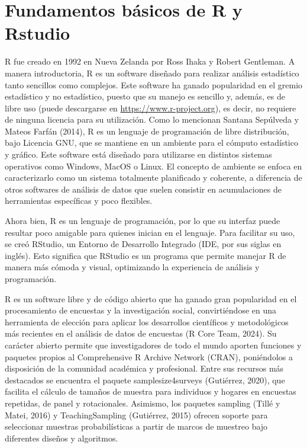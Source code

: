 \documentclass[
  spanish,
  12pt,
]{book}
\begin{document}
\section{Fundamentos básicos de R y Rstudio}\label{fundamentos-buxe1sicos-de-r-y-rstudio}

R fue creado en 1992 en Nueva Zelanda por Ross Ihaka y Robert Gentleman. A manera introductoria, R es un software diseñado para realizar análisis estadístico tanto sencillos como complejos. Este software ha ganado popularidad en el gremio estadístico y no estadístico, puesto que su manejo es sencillo y, además, es de libre uso (puede descargarse en \url{https://www.r-project.org}), es decir, no requiere de ninguna licencia para su utilización. Como lo mencionan Santana Sepúlveda y Mateos Farfán (2014), R es un lenguaje de programación de libre distribución, bajo Licencia GNU, que se mantiene en un ambiente para el cómputo estadístico y gráfico. Este software está diseñado para utilizarse en distintos sistemas operativos como Windows, MacOS o Linux. El concepto de ambiente se enfoca en caracterizarlo como un sistema totalmente planificado y coherente, a diferencia de otros softwares de análisis de datos que suelen consistir en acumulaciones de herramientas específicas y poco flexibles.

Ahora bien, R es un lenguaje de programación, por lo que su interfaz puede resultar poco amigable para quienes inician en el lenguaje. Para facilitar su uso, se creó RStudio, un Entorno de Desarrollo Integrado (IDE, por sus siglas en inglés). Esto significa que RStudio es un programa que permite manejar R de manera más cómoda y visual, optimizando la experiencia de análisis y programación.

R es un software libre y de código abierto que ha ganado gran popularidad en el procesamiento de encuestas y la investigación social, convirtiéndose en una herramienta de elección para aplicar los desarrollos científicos y metodológicos más recientes en el análisis de datos de encuestas (R Core Team, 2024). Su carácter abierto permite que investigadores de todo el mundo aporten funciones y paquetes propios al Comprehensive R Archive Network (CRAN), poniéndolos a disposición de la comunidad académica y profesional. Entre sus recursos más destacados se encuentra el paquete samplesize4surveys (Gutiérrez, 2020), que facilita el cálculo de tamaños de muestra para individuos y hogares en encuestas repetidas, de panel y rotacionales. Asimismo, los paquetes sampling (Tillé y Matei, 2016) y TeachingSampling (Gutiérrez, 2015) ofrecen soporte para seleccionar muestras probabilísticas a partir de marcos de muestreo bajo diferentes diseños y algoritmos.
\end{document}
